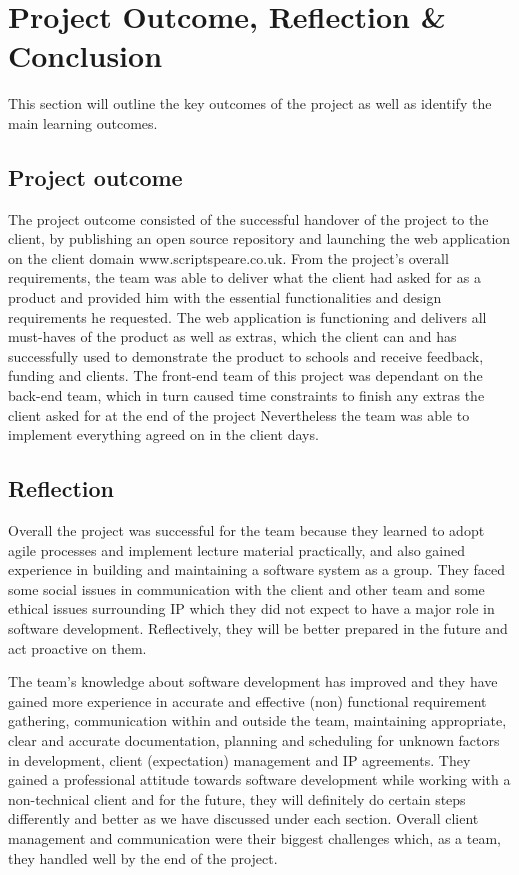 \documentclass{l3proj}
\begin{document}
\section{Project Outcome, Reflection \& Conclusion}

This section will outline the key outcomes of the project as well as identify the main learning outcomes.

\subsection{Project outcome}
The project outcome consisted of the successful handover of the project to the client, by publishing an open source repository and launching the web application on the client domain www.scriptspeare.co.uk. From the project’s overall requirements, the team was able to deliver what the client had asked for as a product and provided him with the essential functionalities and design requirements he requested. The web application is functioning and delivers all must-haves of the product as well as extras, which the client can and has successfully used to demonstrate the product to schools and receive feedback, funding and clients. The front-end team of this project was dependant on the back-end team, which in turn caused time constraints to finish any extras the client asked for at the end of the project Nevertheless the team was able to implement everything agreed on in the client days. 

\subsection{Reflection }
Overall the project was successful for the team because they learned to adopt agile processes and implement lecture material practically, and also gained experience in building and maintaining a software system as a group. 
They faced some social issues in communication with the client and other team and some ethical issues surrounding IP which they did not expect to have a major role in software development. Reflectively, they will be better prepared in the future and act proactive on them. 

The team's knowledge about software development has improved and they have gained more experience in accurate and effective (non) functional requirement gathering, communication within and outside the team, maintaining appropriate, clear and accurate documentation, planning and scheduling for unknown factors in development, client (expectation) management and IP agreements.
They gained a professional attitude towards software development while working with a non-technical client and for the future, they will definitely do certain steps differently and better as we have discussed under each section. Overall client management and communication were their biggest challenges which, as a team, they handled well by the end of the project.  
\end{document}
